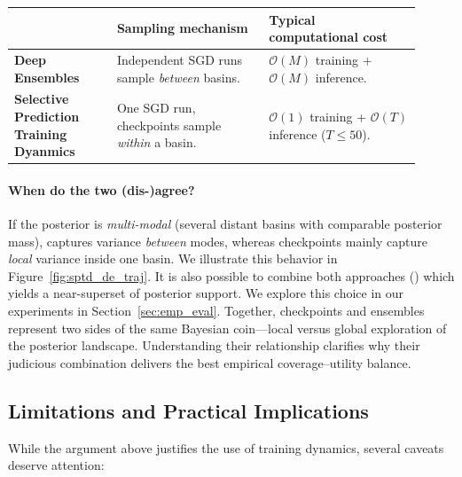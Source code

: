 \begin{center}
\begin{tabular}{p{0.23\linewidth}p{0.34\linewidth}p{0.34\linewidth}}
\toprule
 & \textbf{Sampling mechanism} & \textbf{Typical computational cost} \\
\midrule
\textbf{Deep Ensembles} & Independent SGD runs sample \emph{between} basins. & $\mathcal{O}(M)$ training + $\mathcal{O}(M)$ inference.\\[2pt]
\textbf{Selective Prediction Training Dyanmics} & One SGD run, checkpoints sample \emph{within} a basin. & $\mathcal{O}(1)$ training\footnotemark{} + $\mathcal{O}(T)$ inference ($T\le50$).\\
\bottomrule
\end{tabular}
\end{center}

\paragraph{When do the two (dis-)agree?}  
If the posterior is \emph{multi-modal} (several distant basins with comparable posterior mass), \de captures variance \emph{between} modes, whereas checkpoints mainly capture \emph{local} variance inside one basin. We illustrate this behavior in Figure~\ref{fig:sptd_de_traj}. It is also possible to combine both approaches (\sptdde) which yields a near-superset of posterior support. We explore this choice in our experiments in Section~\ref{sec:emp_eval}. Together, checkpoints and ensembles represent two sides of the same Bayesian coin—local versus global exploration of the posterior landscape.  Understanding their relationship clarifies why their judicious combination delivers the best empirical coverage–utility balance.

\subsection{Limitations and Practical Implications}

While the argument above justifies the use of training dynamics, several caveats deserve attention:


